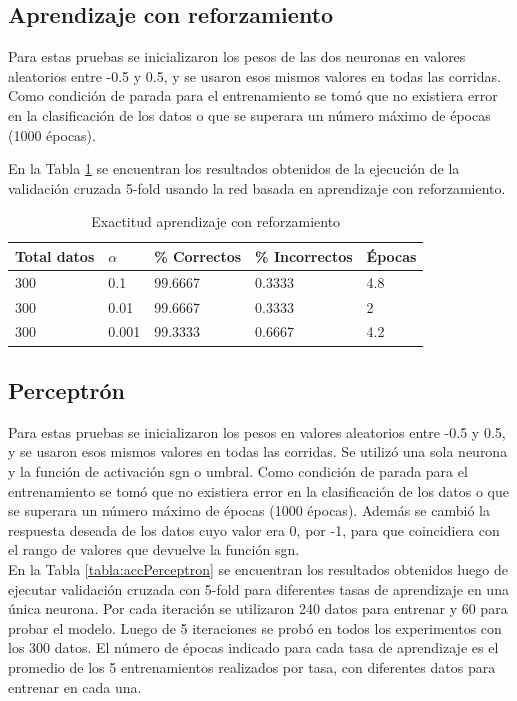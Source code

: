 \documentclass[a4paper]{article}
\begin{document}
	\subsection{Aprendizaje con reforzamiento}
		Para estas pruebas se inicializaron los pesos de las dos neuronas en valores aleatorios entre -0.5 y 0.5, y se usaron esos mismos valores en todas las corridas. Como condición de parada para el entrenamiento se tomó que no existiera error en la clasificación de los datos o que se superara un número máximo de épocas (1000 épocas).
		
		En la Tabla \ref{tabla:accReforzamiento} se encuentran los resultados obtenidos de la ejecución de la validación cruzada 5-fold usando la red basada en aprendizaje con reforzamiento. 
		\begin{table}[H]
		\begin{center}
		\begin{tabular}{|l|l|l|l|l|}
		\hline
		Total datos & $\alpha$ & \% Correctos & \% Incorrectos & Épocas\\
		\hline \hline
		300 & 0.1 & 99.6667 & 0.3333 & 4.8 \\ \hline
		300 & 0.01 & 99.6667 & 0.3333 & 2\\ \hline
		300 & 0.001 & 99.3333 & 0.6667 & 4.2\\ \hline
		\end{tabular}
		\caption{Exactitud aprendizaje con reforzamiento}
		\label{tabla:accReforzamiento}
		\end{center}
		\end{table}
	
	\subsection{Perceptrón}
		Para estas pruebas se inicializaron los pesos en valores aleatorios entre -0.5 y 0.5, y se usaron esos mismos valores en todas las corridas. Se utilizó una sola neurona y la función de activación sgn o umbral. Como condición de parada para el entrenamiento se tomó que no existiera error en la clasificación de los datos o que se superara un número máximo de épocas (1000 épocas). Además se cambió la respuesta deseada de los datos cuyo valor era 0, por -1, para que coincidiera con el rango de valores que devuelve la función sgn.\\
		
		En la Tabla \ref{tabla:accPerceptron} se encuentran los resultados obtenidos luego de ejecutar validación cruzada con 5-fold para diferentes tasas de aprendizaje en una única neurona. Por cada iteración se utilizaron 240 datos para entrenar y 60 para probar el modelo. Luego de 5 iteraciones se probó en todos los experimentos con los 300 datos. El número de épocas indicado para cada tasa de aprendizaje es el promedio de los 5 entrenamientos realizados por tasa, con diferentes datos para entrenar en cada una.\\
		
\end{document}
